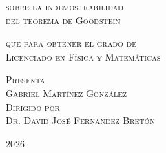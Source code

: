 \begin{titlepage}
\begin{minipage}[c][0.81\textheight][t]{0.75\textwidth}
\begin{center}
      \vspace{1.5cm}            

      
      \textsc{\Large {sobre la indemostrabilidad \\ del teorema de Goodstein}}\\[1cm]
      \vspace{1.0cm}
      
      \textsc{\large{que para obtener el grado de\\}}
       \vspace{1.0cm}
      \textsc{\Large{Licenciado en Física y Matemáticas}}

      \vspace{0.5cm}

       {\large\scshape 
        {\color{black}Presenta}\\[0.3cm] 
        {Gabriel Martínez González}\\[.2in]
        \vspace{0.5cm}
        {Dirigido por}\\[0.3cm] 
        {Dr. David José Fernández Bretón}\\[.2in]}


      \vspace{1cm}
       
      \large{2026}
    \end{center}
  \end{minipage}
\end{titlepage}
